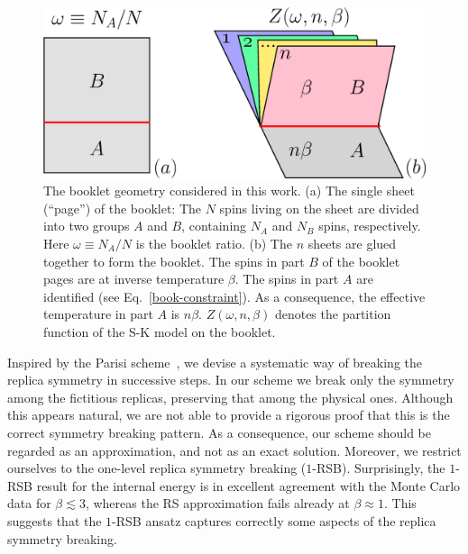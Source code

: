 \documentclass[twocolumn,superscriptaddress,prb,10pt]{revtex4-1}
\begin{document}
\begin{figure}[t]
\includegraphics*[width=0.93\linewidth]{./draft_figs/cartoon}
\caption{ The booklet geometry considered in this work. (a) The single sheet 
 (``page'') of the booklet: The $N$ spins living on the sheet are divided into 
 two groups $A$ and $B$, containing $N_A$ and $N_B$ spins, respectively. Here 
 $\omega\equiv N_A/N$ is the booklet ratio. (b) The $n$ sheets are glued together 
 to form the booklet. The spins in part $B$ of the booklet pages are at inverse 
 temperature $\beta$. The spins in part $A$ are identified  (see Eq.~\eqref{book-constraint}). 
 As a consequence, the effective temperature in part $A$ is $n\beta$. 
 $Z(\omega,n,\beta)$ denotes the partition function of the S-K model on 
 the booklet. 
}
\label{cartoon}
\end{figure}

Inspired by the Parisi scheme~\cite{parisi-1979}, we devise a systematic way of breaking 
the replica symmetry in successive steps. In our scheme we break only the symmetry among 
the fictitious replicas, preserving that among the physical ones. Although this appears 
natural, we are not able to provide a rigorous proof that this is the correct symmetry 
breaking pattern. As a consequence, our scheme should be regarded as an approximation, 
and not as an exact solution. Moreover, we restrict ourselves to the one-level replica 
symmetry breaking ($1$-RSB). Surprisingly, the $1$-RSB result for the internal energy 
is in excellent agreement with the Monte Carlo data for  $\beta\lesssim 3$, whereas the 
RS approximation fails already at $\beta\approx 1$. This suggests that the $1$-RSB ansatz 
captures correctly some aspects of the replica symmetry breaking. 
\end{document}
